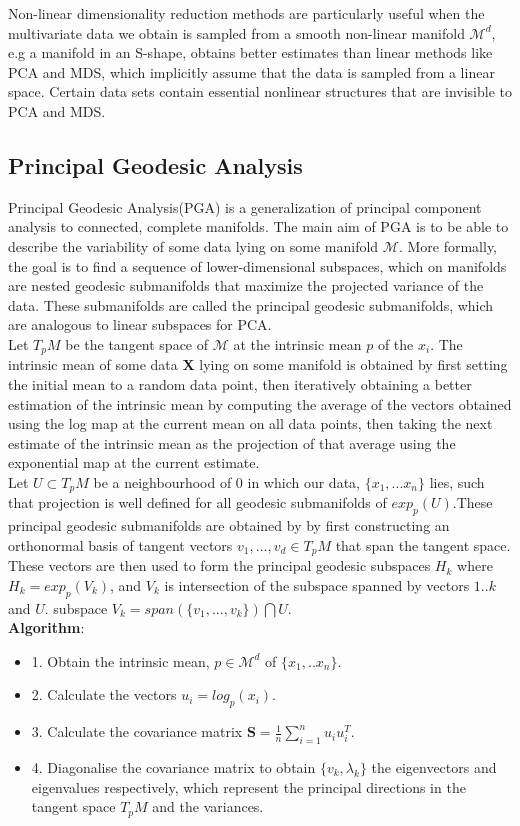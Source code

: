 \documentclass[12pt]{report}
\begin{document}
Non-linear dimensionality reduction methods are particularly useful 
when the multivariate data we obtain is sampled from a smooth non-linear manifold $\mathcal{M}^d$, 
e.g a manifold in an S-shape, obtains better estimates than linear methods like PCA and MDS, 
which implicitly assume that the data is sampled from a linear space. 
Certain data sets contain essential nonlinear structures that are invisible to PCA and MDS.

\newpage

\subsection{Principal Geodesic Analysis}

Principal Geodesic Analysis(PGA) is a generalization of 
principal component analysis to connected, 
complete manifolds. The main aim of PGA is to be able to 
describe the variability of some data lying on some manifold $\mathcal{M}$. 
More formally, the goal is to find a sequence of lower-dimensional subspaces, 
which on manifolds are nested geodesic submanifolds 
that maximize the projected variance of the data. 
These submanifolds are called the principal geodesic submanifolds, 
which are analogous to linear subspaces for PCA.\\
Let $T_pM$ be the tangent space of $\mathcal{M}$ at the intrinsic mean $p$ of the $x_i$. 
The intrinsic mean of some data \textbf{X} lying on some manifold is obtained 
by first setting the initial mean to a random data point, 
then iteratively obtaining a better estimation of the intrinsic mean 
by computing the average of the vectors obtained using the log map at 
the current mean on all data points, then taking the next estimate of the 
intrinsic mean as the projection of that average using the exponential map 
at the current estimate.\\
Let $U \subset T_pM$ be a neighbourhood of 0 in which our data, 
$\{x_1,...x_n\}$ lies, such that projection is well defined 
for all geodesic submanifolds of $exp_p(U)$.These principal geodesic submanifolds 
are obtained by by first constructing an orthonormal basis of tangent vectors 
$v_1,...,v_d \in T_pM$ that span the tangent space. 
These vectors are then used to form the principal geodesic subspaces 
$H_k$ where $H_k = exp_p(V_k)$, and $V_k$ is intersection of the 
subspace spanned by vectors $1..k$ and $U$.
subspace $V_k = span(\{v_1,...,v_k\})\bigcap U$.\\
\textbf{Algorithm}:
\begin{itemize}
    \item 1. Obtain the intrinsic mean, $p \in \mathcal{M}^d$ of $\{x_1,..x_n\}$.
    \item 2. Calculate the vectors $u_i = log_p(x_i)$.
    \item 3. Calculate the covariance matrix $\textbf{S} = \frac{1}{n} \sum^n_{i=1} u_iu_i^T$.
    \item 4. Diagonalise the covariance matrix to obtain $\{v_k, \lambda_k\}$ 
    the eigenvectors and eigenvalues respectively, 
    which represent the principal directions in the tangent space $T_pM$ and the variances.
\end{itemize}
\end{document}
